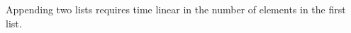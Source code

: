\begin{fence}
\begin{code}
\AgdaOperator{\AgdaFunction{++}}\AgdaSpace{}%
\AgdaSpace{}%
\AgdaSpace{}%
\AgdaSpace{}%
\AgdaSpace{}%
\AgdaInductiveConstructor{[]}\AgdaSymbol{)}\<%
\\
%
\>[2]\<%
\\
\>[2][@{}l@{\AgdaIndent{0}}]%
\>[4]\AgdaSpace{}%
\AgdaSpace{}%
\AgdaSpace{}%
\AgdaSpace{}%
\AgdaSymbol{(}\AgdaSpace{}%
\AgdaSpace{}%
\AgdaInductiveConstructor{[]}\AgdaSpace{}%
\AgdaOperator{\AgdaFunction{++}}\AgdaSpace{}%
\AgdaSpace{}%
\AgdaSpace{}%
\AgdaSpace{}%
\AgdaSpace{}%
\AgdaInductiveConstructor{[]}\AgdaSymbol{)}\<%
\\
%
\>[2]\<%
\\
\>[2][@{}l@{\AgdaIndent{0}}]%
\>[4]\AgdaSpace{}%
\AgdaSpace{}%
\AgdaSpace{}%
\AgdaSpace{}%
\AgdaSpace{}%
\AgdaSpace{}%
\AgdaSymbol{(}\AgdaInductiveConstructor{[]}\AgdaSpace{}%
\AgdaOperator{\AgdaFunction{++}}\AgdaSpace{}%
\AgdaSpace{}%
\AgdaSpace{}%
\AgdaSpace{}%
\AgdaSpace{}%
\AgdaInductiveConstructor{[]}\AgdaSymbol{)}\<%
\\
%
\>[2]\<%
\\
\>[2][@{}l@{\AgdaIndent{0}}]%
\>[4]\AgdaSpace{}%
\AgdaSpace{}%
\AgdaSpace{}%
\AgdaSpace{}%
\AgdaSpace{}%
\AgdaSpace{}%
\AgdaSpace{}%
\AgdaSpace{}%
\AgdaSpace{}%
\AgdaSpace{}%
\AgdaInductiveConstructor{[]}\<%
\\
%
\>[2]\<%
\end{code}
\end{fence}

Appending two lists requires time linear in the number of elements in
the first list.

